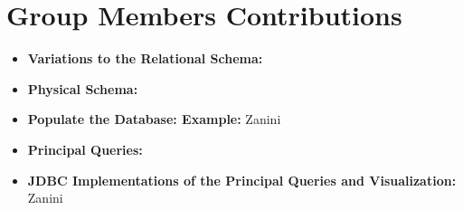 \documentclass{article}
\begin{document}
\maketitle







\newpage
\section{Group Members Contributions}
\begin{itemize}
	\item \textbf{Variations to the Relational Schema:} 
	\item \textbf{Physical Schema:} 
	\item \textbf{Populate the Database: Example:} Zanini
	\item \textbf{Principal Queries:} 
	\item \textbf{JDBC Implementations of the Principal Queries and Visualization:} Zanini
\end{itemize}
\end{document}
